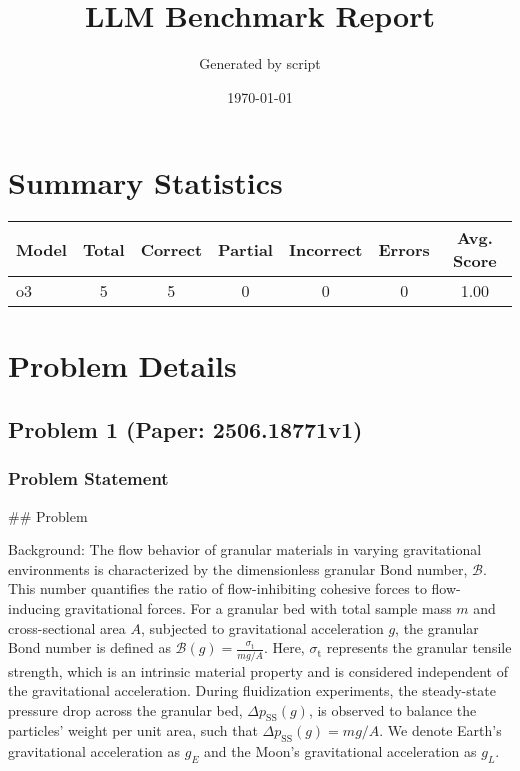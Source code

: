 \documentclass[10pt]{article}
\title{LLM Benchmark Report}
\author{Generated by script}
\date{\today}
\begin{document}
\maketitle

\section*{Summary Statistics}
\begin{center}
\begin{longtable}{|l|c|c|c|c|c|c|}
\hline
\textbf{Model} & \textbf{Total} & \textbf{Correct} & \textbf{Partial} & \textbf{Incorrect} & \textbf{Errors} & \textbf{Avg. Score} \\
\hline
\endfirsthead
\hline
\endfoot
o3 & 5 & 5 & 0 & 0 & 0 & 1.00 \\
\hline
\end{longtable}
\end{center}
\section*{Problem Details}

\subsection*{Problem 1 (Paper: 2506.18771v1)}
\subsubsection*{Problem Statement}
## Problem

Background:
The flow behavior of granular materials in varying gravitational environments is characterized by the dimensionless granular Bond number, $\mathcal{B}$. This number quantifies the ratio of flow-inhibiting cohesive forces to flow-inducing gravitational forces. For a granular bed with total sample mass $m$ and cross-sectional area $A$, subjected to gravitational acceleration $g$, the granular Bond number is defined as $\mathcal{B}(g) = \frac{\sigma_\text{t}}{mg/A}$. Here, $\sigma_\text{t}$ represents the granular tensile strength, which is an intrinsic material property and is considered independent of the gravitational acceleration. During fluidization experiments, the steady-state pressure drop across the granular bed, $\Delta p_\text{SS}(g)$, is observed to balance the particles' weight per unit area, such that $\Delta p_\text{SS}(g) = mg/A$. We denote Earth's gravitational acceleration as $g_E$ and the Moon's gravitational acceleration as $g_L$.
\end{document}
